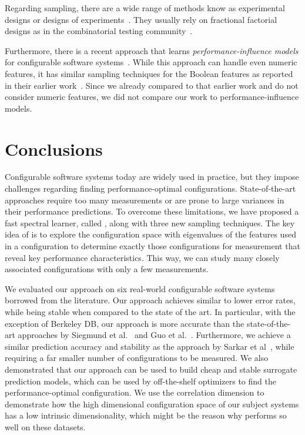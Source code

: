 Regarding sampling, there are a wide range of methods know as experimental designs or designs of experiments~\cite{pukelsheim2006optimal}. They usually rely on fractional factorial designs as in the combinatorial testing community~\cite{Kuhn:2013}. 

Furthermore, there is a recent approach that learns {\em per\-for\-mance-influence models} for configurable software systems~\cite{SGA+15}. While this approach can handle even numeric features, it has similar sampling techniques for the Boolean features as reported in their earlier work~\cite{siegmund2012predicting}. Since we already compared to that earlier work and do not consider numeric features, we did not compare our work to performance-influence models.
 



\section{Conclusions}

Configurable software systems today are widely used in practice, but they impose challenges
regarding finding performance-optimal configurations. State-of-the-art approaches require too
many measurements or are prone to large variances in their performance predictions. To overcome
these limitations, we have proposed a fast spectral learner, called \what,  along with three
new sampling techniques. The key idea of \what is to explore the configuration space with
eigenvalues of the features used in a configuration to determine exactly those configurations
for measurement that reveal key performance characteristics. 
This way, we can study many closely associated configurations with only a few measurements.

We evaluated our approach on six real-world configurable software systems borrowed from the
literature. Our approach achieves similar to lower error rates, while being stable when
compared to the state of the art. In particular, with the exception of Berkeley DB, our
approach is more accurate than the state-of-the-art approaches by Siegmund et
al.~\cite{siegmund2012predicting} and Guo et al.~\cite{guo2013variability}. Furthermore, we
achieve a similar prediction accuracy and stability as the approach by Sarkar et
al~\cite{sarkar2015cost}, while requiring a far smaller number of configurations to be
measured. We also demonstrated that our approach can be used to build cheap and stable
surrogate prediction models, which can be used by off-the-shelf optimizers to find the
performance-optimal configuration.  We use the correlation dimension to demonstrate how the high dimensional configuration space of our subject systems has a low intrinsic dimensionality, which might be the reason why \what performs so well on these datasets. 

